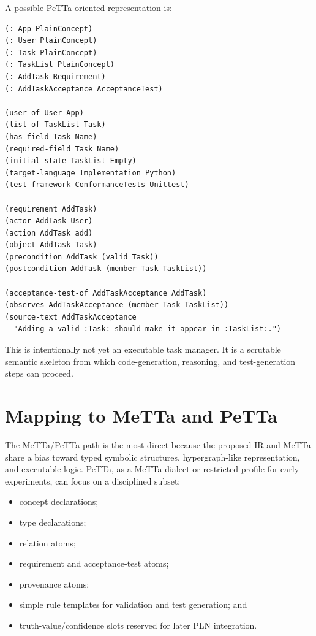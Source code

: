 \documentclass[11pt]{article}
\begin{document}
A possible PeTTa-oriented representation is:
\begin{verbatim}
(: App PlainConcept)
(: User PlainConcept)
(: Task PlainConcept)
(: TaskList PlainConcept)
(: AddTask Requirement)
(: AddTaskAcceptance AcceptanceTest)

(user-of User App)
(list-of TaskList Task)
(has-field Task Name)
(required-field Task Name)
(initial-state TaskList Empty)
(target-language Implementation Python)
(test-framework ConformanceTests Unittest)

(requirement AddTask)
(actor AddTask User)
(action AddTask add)
(object AddTask Task)
(precondition AddTask (valid Task))
(postcondition AddTask (member Task TaskList))

(acceptance-test-of AddTaskAcceptance AddTask)
(observes AddTaskAcceptance (member Task TaskList))
(source-text AddTaskAcceptance
  "Adding a valid :Task: should make it appear in :TaskList:.")
\end{verbatim}

This is intentionally not yet an executable task manager.  It is a scrutable
semantic skeleton from which code-generation, reasoning, and test-generation
steps can proceed.

\section{Mapping to MeTTa and PeTTa}

The MeTTa/PeTTa path is the most direct because the proposed IR and MeTTa share
a bias toward typed symbolic structures, hypergraph-like representation, and
executable logic.  PeTTa, as a MeTTa dialect or restricted profile for early
experiments, can focus on a disciplined subset:
\begin{itemize}
  \item concept declarations;
  \item type declarations;
  \item relation atoms;
  \item requirement and acceptance-test atoms;
  \item provenance atoms;
  \item simple rule templates for validation and test generation; and
  \item truth-value/confidence slots reserved for later PLN integration.
\end{itemize}
\end{document}

